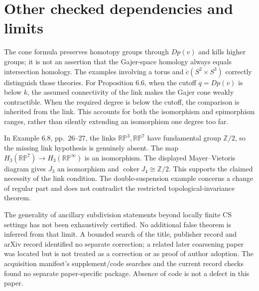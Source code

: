 \documentclass[10pt]{article}
\begin{document}
\section*{Other checked dependencies and limits}
The cone formula preserves homotopy groups through \(Dp(v)\) and kills higher groups; it is not an assertion that the Gajer-space homology always equals intersection homology. The examples involving a torus and \(\mathring c(S^2\times S^3)\) correctly distinguish those theories. For Proposition 6.6, when the cutoff \(q=Dp(v)\) is below \(k\), the assumed connectivity of the link makes the Gajer cone weakly contractible. When the required degree is below the cutoff, the comparison is inherited from the link. This accounts for both the isomorphism and epimorphism ranges, rather than silently extending an isomorphism one degree too far.\par
In Example 6.8, pp. 26–27, the links \(\mathbb{RP}^3,\mathbb{RP}^7\) have fundamental group \(\mathbb Z/2\), so the missing link hypothesis is genuinely absent. The map \(H_3(\mathbb{RP}^7)\to H_3(\mathbb{RP}^{\infty})\) is an isomorphism. The displayed Mayer–Vietoris diagram gives \(J_3\) an isomorphism and \(\operatorname{coker}J_4\cong\mathbb Z/2\). This supports the claimed necessity of the link condition. The double-suspension example concerns a change of regular part and does not contradict the restricted topological-invariance theorem.\par
The generality of ancillary subdivision statements beyond locally finite CS settings has not been exhaustively certified. No additional false theorem is inferred from that limit. A bounded search of the title, publisher record and arXiv record identified no separate correction; a related later coarsening paper was located but is not treated as a correction or as proof of author adoption. The acquisition manifest’s supplement/code searches and the current record checks found no separate paper-specific package. Absence of code is not a defect in this paper.\par
\end{document}
